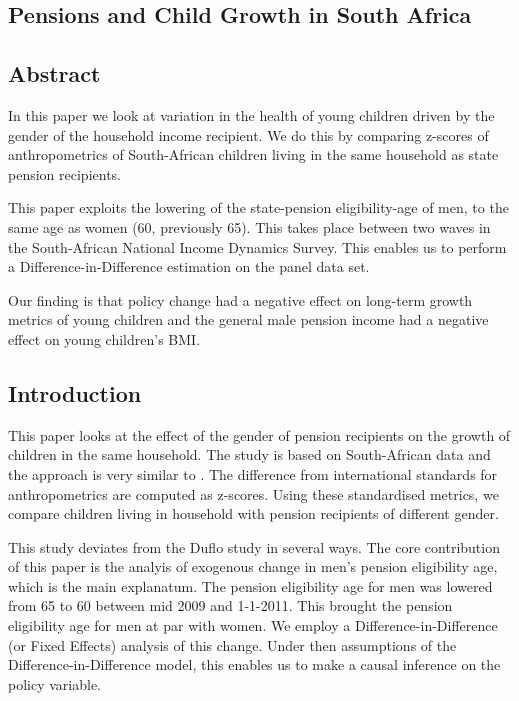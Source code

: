 \begin{refsection}
\chapter{Pensions and Child Growth in South Africa}
\label{sa}
\section*{Abstract}
In this paper we look at variation in the health of young children driven by the gender of the household income recipient.
We do this by comparing z-scores of anthropometrics of South-African children living in the same household as state pension recipients.

This paper exploits the lowering of the state-pension eligibility-age of men, 
to the same age as women (60, previously 65).
This takes place between two waves in the South-African National Income Dynamics Survey.
This enables us to perform a Difference-in-Difference estimation on the panel data set.

Our finding is that policy change had a negative effect on long-term growth metrics of young children
and the general male pension income had a negative effect on young children's BMI.
\pagebreak

\section{Introduction}
\label{sa:intro}
This paper looks at the effect of the gender of pension recipients on the growth of children in the same household.
The study is based on South-African data and the approach is very similar to \textcite{duflo2000child,duflo2003grandmothers}.
The difference from international standards \parencite[WHO Child Growth Standards]{who2006child} for anthropometrics are computed as z-scores.
Using these standardised metrics, we compare children living in household with pension recipients of different gender.

This study deviates from the Duflo study in several ways.
The core contribution of this paper is the analyis of exogenous change in men's pension eligibility age,
which is the main explanatum.
The pension eligibility age for men was lowered from 65 to 60 between mid 2009 and 1-1-2011.
This brought the pension eligibility age for men at par with women.
We employ a Difference-in-Difference (or Fixed Effects) analysis of this change.
Under then assumptions of the Difference-in-Difference model,
this enables us to make a causal inference on the policy variable.


\end{refsection}
